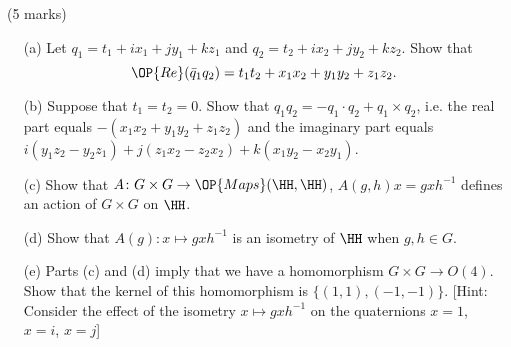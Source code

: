 \documentclass[12pt]{article}
\begin{document}
\vspace{1cm}

\begin{question}\ (5 marks)\\
  \begin{enumerate}
  \item[(a)]  Let $q_1=t_1+ix_1+jy_1+kz_1$ and $q_2=t_2+ix_2+jy_2+kz_2$. Show that
  \[\OP{Re}(\bar{q}_1q_2)=t_1t_2+x_1x_2+y_1y_2+z_1z_2.\]
  \item[(b)] Suppose that $t_1=t_2=0$. Show that $q_1q_2=-q_1\cdot q_2+q_1\times q_2$, i.e. the real part equals $-(x_1x_2+y_1y_2+z_1z_2)$ and the imaginary part equals $i(y_1z_2-y_2z_1)+j(z_1x_2-z_2x_2)+k(x_1y_2-x_2y_1)$.
  \item[(c)] Show that $A\colon G\times G\to\OP{Maps}(\HH,\HH)$, $A(g,h)x=gxh^{-1}$ defines an action of $G\times G$ on $\HH$.
  \item[(d)] Show that $A(g)\colon x\mapsto gxh^{-1}$ is an isometry of $\HH$ when $g,h\in G$.
  \item[(e)] Parts (c) and (d) imply that we have a homomorphism $G\times G\to O(4)$. Show that the kernel of this homomorphism is $\{(1,1),(-1,-1)\}$. [Hint: Consider the effect of the isometry $x\mapsto gxh^{-1}$ on the quaternions $x=1$, $x=i$, $x=j$]
  \end{enumerate}
\end{question}
\iffalse
\begin{answer}
  \begin{enumerate}
  \item[(a)] We have
    \[(t_1-ix_1-jy_1-kz_1)(t_2+ix_2+jy_2+k_2)=t_1t_2-i^2x_1x_2-j^2y_1y_2-k^2z_1z_2+i(\cdots)+j(\cdots)+k(\cdots).\]
  \item[(b)] We have
    \[(ix_1+jy_1+kz_1)(ix_2+jy_2+kz_2)=-(x_1x_2+y_1y_2+z_1z_2)+ijx_1y_2+jiy_1x_2+\cdots\]
    and $ij=-ji=k$, etc.
  \item[(c)] We need to show that $A(1,1)(x)=1x1=x$ and that
    \begin{align*}
      A(g_1,h_1)A(g_2,h_2)x&=A(g_1,h_1)g_2xh_2^{-1})\\
      &=g_1g_2xh_2^{-1}h_1^{-1}\\
      &=g_1g_2x(h_1h_2)^{-1}\\
      &=A(g_1g_2,h_1h_2)x.
    \end{align*}
  \item[(d)] We have $|gxh^{-1}|=|g||x||h^{-1}|=|x|$ since $|g|=|h|=|h^{-1}|=1$.
  \item[(e)] $(g,h)$ is in the kernel of this homomorphism if $gxh^{-1}=x$ for all $x$, i.e. $gx=xh$. For $x=1$ this implies $g=h$. For $x=i$ this implies $gi=ig$. If $g=a+ib+jc+kd$ then $gi-ig=ai-b-kc+jd-ia+b-kc+jd=2(jd-kc)$ so $gi-ig=0$ implies $d=c=0$. Similarly, $gj=jg$ implies $b=0$. Therefore $g$ is real and has length 1, so it must be $\pm 1$. This leaves the two possibilities $(1,1)$ and $(-1,-1)$.
  \end{enumerate}
\end{answer}
\fi
\end{document}
